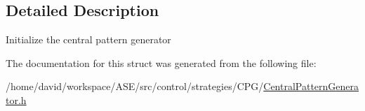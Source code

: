 \subsection{Detailed Description}
Initialize the central pattern generator 

The documentation for this struct was generated from the following file:\begin{CompactItemize}
\item 
/home/david/workspace/ASE/src/control/strategies/CPG/\hyperlink{CentralPatternGenerator_8h}{CentralPatternGenerator.h}\end{CompactItemize}

